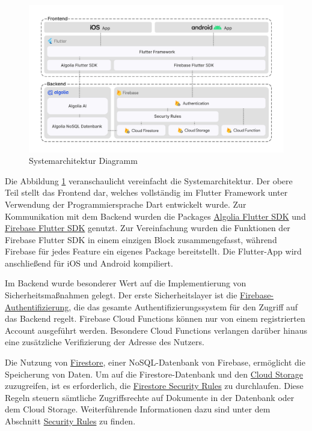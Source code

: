 

\begin{figure}[H]
    \centering
    \includegraphics[width=1\textwidth]{pics/systemarchitektur_diagram.png}
    \caption{Systemarchitektur Diagramm}
    \label{fig:systemarchitektur}
\end{figure}

Die Abbildung \ref{fig:systemarchitektur}
veranschaulicht vereinfacht die Systemarchitektur. Der
obere Teil stellt das Frontend dar, welches vollständig im
Flutter Framework unter Verwendung der Programmiersprache
Dart entwickelt wurde. Zur Kommunikation mit dem Backend
wurden die Packages \href{https://pub.dev/packages/algolia}{Algolia
    Flutter SDK} und
\href{https://pub.dev/packages/firebase}{Firebase Flutter
    SDK} genutzt. Zur Vereinfachung wurden die Funktionen der
Firebase Flutter SDK in einem einzigen Block
zusammengefasst, während Firebase für jedes Feature ein
eigenes Package bereitstellt. Die Flutter-App wird
anschließend für iOS und Android kompiliert.

Im Backend wurde besonderer Wert auf die Implementierung von
Sicherheitsmaßnahmen gelegt. Der erste Sicherheitslayer ist
die
\href{https://firebase.google.com/docs/auth}{Firebase-Authentifizierung},
die das gesamte Authentifizierungssystem für den Zugriff auf
das Backend regelt. Firebase Cloud Functions können nur von
einem registrierten Account ausgeführt werden. Besondere
Cloud Functions verlangen darüber hinaus eine zusätzliche
Verifizierung der Adresse des Nutzers.

Die Nutzung von
\href{https://firebase.google.com/docs/firestore}{Firestore},
einer NoSQL-Datenbank von Firebase, ermöglicht die
Speicherung von Daten. Um auf die Firestore-Datenbank und
den \href{https://firebase.google.com/docs/storage}{Cloud
    Storage} zuzugreifen, ist es erforderlich, die
\href{https://firebase.google.com/docs/firestore/security/overview}{Firestore
    Security Rules} zu durchlaufen. Diese Regeln steuern
sämtliche Zugriffsrechte auf Dokumente in der Datenbank oder
dem Cloud Storage. Weiterführende Informationen dazu sind
unter dem Abschnitt \hyperref[sec:security-rules]{Security Rules} zu
finden.

